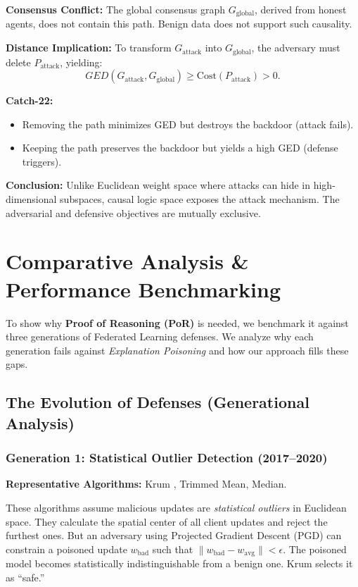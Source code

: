 \documentclass[journal]{IEEEtran}
\begin{document}
\textbf{Consensus Conflict:}
The global consensus graph $G_{\text{global}}$, derived from honest agents, does not contain this path. Benign data does not support such causality.

\textbf{Distance Implication:}
To transform $G_{\text{attack}}$ into $G_{\text{global}}$, the adversary must delete $P_{\text{attack}}$, yielding:
\[
GED(G_{\text{attack}}, G_{\text{global}})
\geq
\text{Cost}(P_{\text{attack}}) > 0. \]

\textbf{Catch-22:}
\begin{itemize}
 \item Removing the path minimizes GED but destroys the backdoor (attack fails).
 \item Keeping the path preserves the backdoor but yields a high GED (defense triggers).
\end{itemize}

\textbf{Conclusion:}
Unlike Euclidean weight space where attacks can hide in high-dimensional subspaces, causal logic space exposes the attack mechanism. The adversarial and defensive objectives are mutually exclusive.

\newpage
\section{Comparative Analysis \& Performance Benchmarking}

To show why \textbf{Proof of Reasoning (PoR)} is needed, we benchmark it against three generations of Federated Learning defenses. We analyze why each generation fails against \emph{Explanation Poisoning} and how our approach fills these gaps.

\subsection{The Evolution of Defenses (Generational Analysis)}

\subsubsection{Generation 1: Statistical Outlier Detection (2017--2020)}

\textbf{Representative Algorithms:} Krum \cite{blanchard2017}, Trimmed Mean, Median.

These algorithms assume malicious updates are \emph{statistical outliers} in Euclidean space. They calculate the spatial center of all client updates and reject the furthest ones. But an adversary using Projected Gradient Descent (PGD) can constrain a poisoned update $w_{\text{bad}}$ such that $\lVert w_{\text{bad}} - w_{\text{avg}} \rVert < \epsilon$. The poisoned model becomes statistically indistinguishable from a benign one. Krum selects it as ``safe.''
\end{document}
